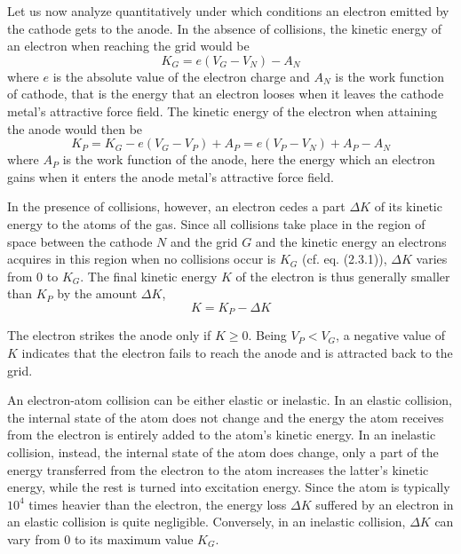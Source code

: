 \documentclass{article}
\begin{document}
Let us now analyze quantitatively under which conditions an electron emitted by the cathode gets to the anode. In the absence of collisions, the kinetic energy of an electron when reaching the grid would be
$$
\begin{equation*}
K_{G}=e\left(V_{G}-V_{N}\right)-A_{N} \tag{2.3.1}
\end{equation*}
$$
where $e$ is the absolute value of the electron charge and $A_{N}$ is the work function of cathode, that is the energy that an electron looses when it leaves the cathode metal's attractive force field. The kinetic energy of the electron when attaining the anode would then be
$$
\begin{equation*}
K_{P}=K_{G}-e\left(V_{G}-V_{P}\right)+A_{P}=e\left(V_{P}-V_{N}\right)+A_{P}-A_{N} \tag{2.3.2}
\end{equation*}
$$
where $A_{P}$ is the work function of the anode, here the energy which an electron gains when it enters the anode metal's attractive force field.

In the presence of collisions, however, an electron cedes a part $\Delta K$ of its kinetic energy to the atoms of the gas. Since all collisions take place in the region of space between the cathode $N$ and the grid $G$ and the kinetic energy an electrons acquires in this region when no collisions occur is $K_{G}$ (cf. eq. (2.3.1)), $\Delta K$ varies from 0 to $K_{G}$. The final kinetic energy $K$ of the electron is thus generally smaller than $K_{P}$ by the amount $\Delta K$,
$$
\begin{equation*}
K=K_{P}-\Delta K \tag{2.3.3}
\end{equation*}
$$

The electron strikes the anode only if $K \geq 0$. Being $V_{P}<V_{G}$, a negative value of $K$ indicates that the electron fails to reach the anode and is attracted back to the grid.

An electron-atom collision can be either elastic or inelastic. In an elastic collision, the internal state of the atom does not change and the energy the atom receives from the electron is entirely added to the atom's kinetic energy. In an inelastic collision, instead, the internal state of the atom does change, only a part of the energy transferred from the electron to the atom increases the latter's kinetic energy, while the rest is turned into excitation energy. Since the atom is typically $10^{4}$ times heavier than the electron, the energy loss $\Delta K$ suffered by an electron in an elastic collision is quite negligible. Conversely, in an inelastic collision, $\Delta K$ can vary from 0 to its maximum value $K_{G}$.
\end{document}
